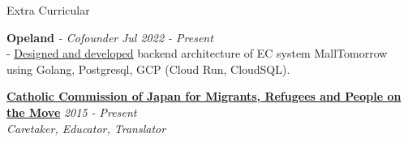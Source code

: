 \documentclass{resume} %
\begin{document}
\begin{rSection}{Extra Curricular}



{\bf Opeland}{\textit{ - Cofounder}} \hfill {\em Jul 2022 - Present} 
\\- \uline{Designed and developed} backend architecture of EC system MallTomorrow using Golang, Postgresql, GCP (Cloud Run, CloudSQL). 

{\bf\href{https://www.cbcj.catholic.jp/english/japan/comt/migrantsrefugees_e/}{Catholic Commission of Japan for Migrants, Refugees and People on the
Move}} \hfill {\em 2015 - Present} \\
{\textit{Caretaker, Educator, Translator}}



\end{rSection}



\end{document}
